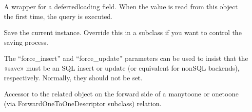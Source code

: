 \documentclass[letterpaper,10pt,spanish]{sphinxmanual}
\begin{document}
\begin{fulllineitems}
\begin{fulllineitems}
\pysigstartsignatures
{}
\pysigstopsignatures
\end{fulllineitems}



\begin{fulllineitems}

\pysigstartsignatures
{}
\pysigstopsignatures
\end{fulllineitems}



\begin{fulllineitems}

\pysigstartsignatures
{}
\pysigstopsignatures
\sphinxAtStartPar
A wrapper for a deferred\sphinxhyphen{}loading field. When the value is read from this
object the first time, the query is executed.

\end{fulllineitems}



\begin{fulllineitems}

\pysigstartsignatures
{}
\pysigstopsignatures
\sphinxAtStartPar
Save the current instance. Override this in a subclass if you want to
control the saving process.

\sphinxAtStartPar
The “force\_insert” and “force\_update” parameters can be used to insist
that the «save» must be an SQL insert or update (or equivalent for
non\sphinxhyphen{}SQL backends), respectively. Normally, they should not be set.

\end{fulllineitems}



\begin{fulllineitems}

\pysigstartsignatures
{}
\pysigstopsignatures
\sphinxAtStartPar
Accessor to the related object on the forward side of a many\sphinxhyphen{}to\sphinxhyphen{}one or
one\sphinxhyphen{}to\sphinxhyphen{}one (via ForwardOneToOneDescriptor subclass) relation.


\end{fulllineitems}
\end{fulllineitems}
\end{document}
